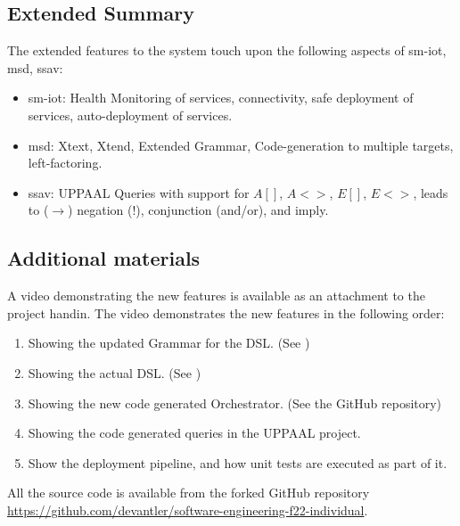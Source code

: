 \subsection*{Extended Summary}

The extended features to the system touch upon the following aspects of \acrshort{sm-iot}, \acrshort{msd}, \acrshort{ssav}:

\begin{itemize}[leftmargin=*]
    \item \acrshort{sm-iot}: Health Monitoring of services, connectivity, safe deployment of services, auto-deployment of services.
    \item \acrshort{msd}: Xtext, Xtend, Extended Grammar, Code-generation to multiple targets, left-factoring.  
    \item \acrshort{ssav}: UPPAAL Queries with support for $A[]$, $A<>$, $E[]$, $E<>$, leads to ($\rightarrow$) negation ($!$), conjunction (and/or), and imply.
\end{itemize}

\subsection*{Additional materials}

A video demonstrating the new features is available as an attachment to the project handin. The video demonstrates the new features in the following order:

\begin{enumerate}[leftmargin=*]
    \item Showing the updated Grammar for the DSL. (See )
    \item Showing the actual DSL. (See )
    \item Showing the new code generated Orchestrator. (See the GitHub repository)
    \item Showing the code generated queries in the UPPAAL project.
    \item Show the deployment pipeline, and how  unit tests are executed as part of it.
\end{enumerate}

All the source code is available from the forked GitHub repository \href{https://github.com/devantler/software-engineering-f22-individual}{https://github.com/devantler/software-engineering-f22-individual}.
